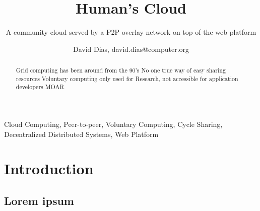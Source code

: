 \documentclass{./llncs2e/llncs}
\begin{document}
\title{Human's Cloud}

\subtitle{A community cloud served by a P2P overlay network on top of the web platform}
\author{David Dias, david.dias@computer.org}

\maketitle



% 
% 

\begin{abstract}
Grid computing has been around from the 90's
No one true way of easy sharing resources
Voluntary computing only used for Research, not accessible for application developers
MOAR

\end{abstract}




% 
% 

\begin{keywords}
Cloud Computing, Peer-to-peer, Voluntary Computing, Cycle Sharing, Decentralized Distributed Systems, Web Platform 
\end{keywords}




% 
% 

\section{Introduction}

\subsection{Lorem ipsum}
\end{document}
